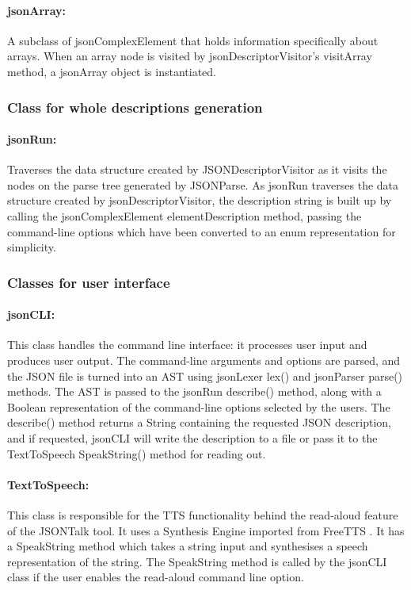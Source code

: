 \documentclass{l4proj}
\begin{document}
\paragraph{\textbf{jsonArray}:} A subclass of jsonComplexElement that holds information specifically about arrays. When an array node is visited by jsonDescriptorVisitor's visitArray method, a jsonArray object is instantiated.\hfill \break

\subsubsection{Class for whole descriptions generation} \hfill

\paragraph{\textbf{jsonRun}:} Traverses the data structure created by JSONDescriptorVisitor as it visits the nodes on the parse tree generated by JSONParse. As jsonRun traverses the data structure created by jsonDescriptorVisitor, the description string is built up by calling the jsonComplexElement elementDescription method, passing the command-line options which have been converted to an enum representation for simplicity.\hfill
\break

\subsubsection{Classes for user interface} \hfill 

\paragraph{\textbf{jsonCLI}:} This class handles the command line interface: it processes user input and produces user output. The command-line arguments and options are parsed, and the JSON file is turned into an AST using jsonLexer lex() and jsonParser parse() methods. The AST is passed to the jsonRun describe() method, along with a Boolean representation of the command-line options selected by the users. The describe() method returns a String containing the requested JSON description, and if requested, jsonCLI will write the description to a file or pass it to the TextToSpeech SpeakString() method for reading out.

\paragraph{\textbf{TextToSpeech}:} This class is responsible for the TTS functionality behind the read-aloud feature of the JSONTalk tool. It uses a Synthesis Engine imported from FreeTTS \cite{freetts}. It has a SpeakString method which takes a string input and synthesises a speech representation of the string. The SpeakString method is called by the jsonCLI class if the user enables the read-aloud command line option.
\end{document}
